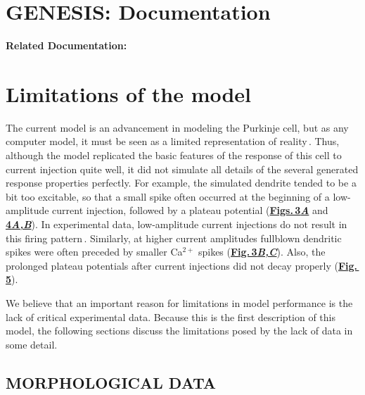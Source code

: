 \documentclass[12pt]{article}
\begin{document}
\section*{GENESIS: Documentation}

{\bf Related Documentation:}

\section*{Limitations of the model}

The current model is an advancement in modeling the
Purkinje cell, but as any computer model, it must be seen as
a limited representation of reality\,\cite{Bower:1992vn}.
Thus, although the model replicated the basic features of
the response of this cell to current injection quite well, it did
not simulate all details of the several generated response
properties perfectly. For example, the simulated dendrite
tended to be a bit too excitable, so that a small spike often
occurred at the beginning of a low-amplitude current injection,
followed by a plateau potential (\href{../pub-purkinje-deschutter1-fig-3/pub-purkinje-deschutter1-fig-3.tex}{\bf Figs.\,3{\it A}} and \href{../pub-purkinje-deschutter1-fig-4/pub-purkinje-deschutter1-fig-4.tex}{\bf 4{\it A,B}}).
In experimental data, low-amplitude current injections
do not result in this firing pattern\,\cite{R:1980ly, R:1980pi}. 
Similarly, at higher current amplitudes fullblown
dendritic spikes were often preceded by smaller Ca$^{2+}$
spikes (\href{../pub-purkinje-deschutter1-fig-3/pub-purkinje-deschutter1-fig-3.tex}{\bf Fig.\,3{\it B,C}}). Also, the prolonged plateau potentials
after current injections did not decay properly (\href{../pub-purkinje-deschutter1-fig-5/pub-purkinje-deschutter1-fig-5.tex}{\bf Fig.\,5}).

We believe that an important reason for limitations in
model performance is the lack of critical experimental data.
Because this is the first description of this model, the following
sections discuss the limitations posed by the lack of data
in some detail.

\subsection*{MORPHOLOGICAL DATA}
\end{document}
